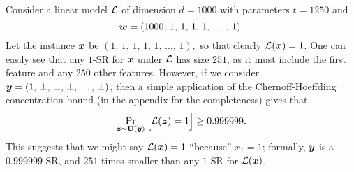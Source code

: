 

\begin{example}
Consider a linear model $\mathcal{L}$ of dimension $d= 1000$ with parameters $t = 1250$ and
$$
	{\bm{w}} = (
		1000, \, 1, \, 1, \,  1, \,  1, \,  \ldots, \, 1
	).
$$
Let the instance ${\bm{x}}$ be 
	$(
		1, \, 1, \, 1, \,  1, \,  1, \,  \ldots, \, 1
	),$ so that clearly $\mathcal{L}({\bm{x}}) = 1$.
One can easily see that any $1$-SR for ${\bm{x}}$ under $\mathcal{L}$ has size $251$, as it must include the first feature and any $250$ other features.
However, if we consider ${\bm{y}} = (
		1, \, \bot, \, \bot, \,  \bot,  \ldots, \, \bot
	)$, then a simple application of the Chernoff-Hoeffding concentration bound (in the appendix for the completeness) gives that
\[
	\Pr_{{\bm{z}} \sim \mathbf{U}({\bm{y}})}\Big[ \mathcal{L}({\bm{z}}) = 1\Big] \geq  0.999999.\]
	This suggests that we might say $\mathcal{L}({\bm{x}}) = 1$ ``because'' $x_1 = 1$; formally, ${\bm{y}}$ is a $0.999999$-SR, and $251$ times smaller than any $1$-SR for $\mathcal{L}({\bm{x}})$.
\label{ex:delta-sr-size}
\end{example}


